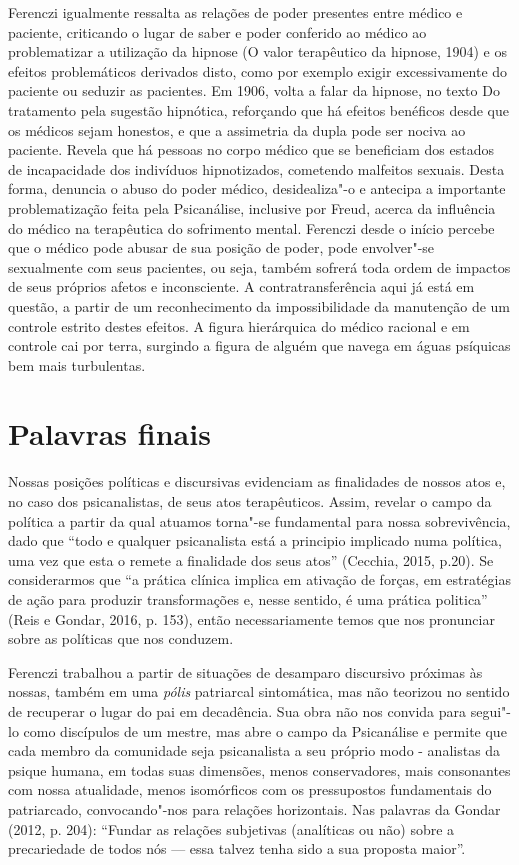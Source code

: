 Ferenczi igualmente ressalta as relações de poder presentes entre médico
e paciente, criticando o lugar de saber e poder conferido ao médico ao
problematizar a utilização da hipnose (O valor terapêutico da hipnose,
1904) e os efeitos problemáticos derivados disto, como por exemplo
exigir excessivamente do paciente ou seduzir as pacientes. Em 1906,
volta a falar da hipnose, no texto Do tratamento pela sugestão
hipnótica, reforçando que há efeitos benéficos desde que os médicos
sejam honestos, e que a assimetria da dupla pode ser nociva ao paciente.
Revela que há pessoas no corpo médico que se beneficiam dos estados de
incapacidade dos indivíduos hipnotizados, cometendo malfeitos sexuais.
Desta forma, denuncia o abuso do poder médico, desidealiza"-o e antecipa
a importante problematização feita pela Psicanálise, inclusive por
Freud, acerca da influência do médico na terapêutica do sofrimento
mental. Ferenczi desde o início percebe que o médico pode abusar de sua
posição de poder, pode envolver"-se sexualmente com seus pacientes, ou
seja, também sofrerá toda ordem de impactos de seus próprios afetos e
inconsciente. A contratransferência aqui já está em questão, a partir de
um reconhecimento da impossibilidade da manutenção de um controle
estrito destes efeitos. A figura hierárquica do médico racional e em
controle cai por terra, surgindo a figura de alguém que navega em águas
psíquicas bem mais turbulentas.

\section{Palavras finais}

Nossas posições políticas e discursivas evidenciam as finalidades de
nossos atos e, no caso dos psicanalistas, de seus atos terapêuticos.
Assim, revelar o campo da política a partir da qual atuamos torna"-se
fundamental para nossa sobrevivência, dado que ``todo e qualquer
psicanalista está a principio implicado numa política, uma vez que esta
o remete a finalidade dos seus atos'' (Cecchia, 2015, p.20). Se
considerarmos que ``a prática clínica implica em ativação de forças, em
estratégias de ação para produzir transformações e, nesse sentido, é uma
prática politica'' (Reis e Gondar, 2016, p. 153), então necessariamente
temos que nos pronunciar sobre as políticas que nos conduzem.

Ferenczi trabalhou a partir de situações de desamparo discursivo
próximas às nossas, também em uma \emph{pólis} patriarcal sintomática,
mas não teorizou no sentido de recuperar o lugar do pai em decadência.
Sua obra não nos convida para segui"-lo como discípulos de um mestre, mas
abre o campo da Psicanálise e permite que cada membro da comunidade seja
psicanalista a seu próprio modo - analistas da psique humana, em todas
suas dimensões, menos conservadores, mais consonantes com nossa
atualidade, menos isomórficos com os pressupostos fundamentais do
patriarcado, convocando"-nos para relações horizontais. Nas palavras da
Gondar (2012, p. 204): ``Fundar as relações subjetivas (analíticas ou
não) sobre a precariedade de todos nós --- essa talvez tenha sido a sua
proposta maior''.

